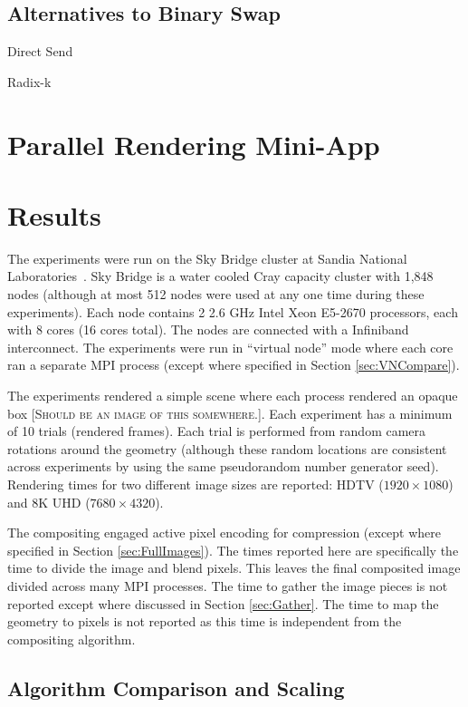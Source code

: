 \documentclass{vgtc}                          %
\newcommand*{\lcite}[1]{~\cite{#1}}
\newcommand{\fix}[1]{{\color{red}\textsc{[#1]}}}
\begin{document}
\subsection{Alternatives to Binary Swap}
\label{sec:BinarySwapAlternatives}

Direct Send

Radix-k

\section{Parallel Rendering Mini-App}

\section{Results}
\label{sec:Results}

The experiments were run on the Sky Bridge cluster at Sandia National Laboratories\lcite{SkyBridge}.
Sky Bridge is a water cooled Cray capacity cluster with 1,848 nodes (although at most 512 nodes were used at any one time during these experiments).
Each node contains 2 2.6 GHz Intel Xeon E5-2670 processors, each with 8 cores (16 cores total).
The nodes are connected with a Infiniband interconnect.
The experiments were run in ``virtual node'' mode where each core ran a separate MPI process (except where specified in Section \ref{sec:VNCompare}).

The experiments rendered a simple scene where each process rendered an opaque box \fix{Should be an image of this somewhere.}.
Each experiment has a minimum of 10 trials (rendered frames).
Each trial is performed from random camera rotations around the geometry (although these random locations are consistent across experiments by using the same pseudorandom number generator seed).
Rendering times for two different image sizes are reported: HDTV ($1920 \times 1080$) and 8K UHD ($7680 \times 4320$).

The compositing engaged active pixel encoding for compression (except where specified in Section \ref{sec:FullImages}).
The times reported here are specifically the time to divide the image and blend pixels.
This leaves the final composited image divided across many MPI processes.
The time to gather the image pieces is not reported except where discussed in Section \ref{sec:Gather}.
The time to map the geometry to pixels is not reported as this time is independent from the compositing algorithm.

\subsection{Algorithm Comparison and Scaling}
\label{sec:Scaling}
\end{document}
